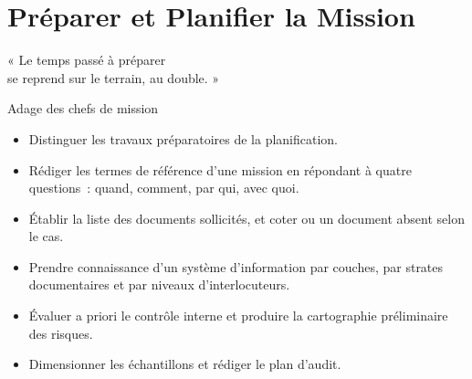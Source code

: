 
\chapter{Préparer et Planifier la Mission}
\label{chap:planifier}

\epigraph{%
    « Le temps passé à préparer\\
    se reprend sur le terrain, au double. »%
}{Adage des chefs de mission}


\begin{boxobjectifs}
\begin{itemize}
    \item Distinguer les travaux préparatoires de la planification.
    \item Rédiger les termes de référence d'une mission en répondant à quatre
          questions~: quand, comment, par qui, avec quoi.
    \item Établir la liste des documents sollicités, et coter \NEK{} ou
          \NON{} un document absent selon le cas.
    \item Prendre connaissance d'un système d'information par couches, par
          strates documentaires et par niveaux d'interlocuteurs.
    \item Évaluer a priori le contrôle interne et produire la cartographie
          préliminaire des risques.
    \item Dimensionner les échantillons et rédiger le plan d'audit.
\end{itemize}
\end{boxobjectifs}

